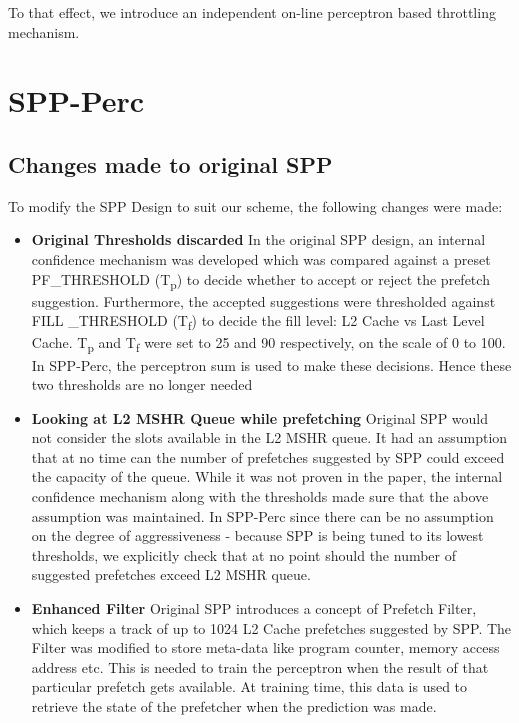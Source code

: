\documentclass{sig-alternate}
\begin{document}
To that effect, we introduce an independent on-line perceptron based throttling mechanism.

\section{SPP-Perc}

\subsection{Changes made to original SPP}
To modify the SPP Design to suit our scheme, the following changes were made:

\begin{itemize}
\item \textbf{Original Thresholds discarded}\newline
In the original SPP design, an internal confidence mechanism was developed which was compared against a preset PF\_THRESHOLD (T\textsubscript{p}) to decide whether to accept or reject the prefetch suggestion.
Furthermore, the accepted suggestions were thresholded against FILL \_THRESHOLD (T\textsubscript{f}) to decide the fill level: L2 Cache vs Last Level Cache.
T\textsubscript{p} and T\textsubscript{f} were set to 25 and 90 respectively, on the scale of 0 to 100.
In SPP-Perc, the perceptron sum is used to make these decisions. 
Hence these two thresholds are no longer needed

\item \textbf{Looking at L2 MSHR Queue while prefetching}\newline
Original SPP would not consider the slots available in the L2 MSHR queue. 
It had an assumption that at no time can the number of prefetches suggested by SPP could exceed the capacity of the queue. 
While it was not proven in the paper, the internal confidence mechanism along with the thresholds made sure that the above assumption was maintained. 
In SPP-Perc since there can be no assumption on the degree of aggressiveness - because SPP is being tuned to its lowest thresholds, we explicitly check that at no point should the number of suggested prefetches exceed L2 MSHR queue.

\item \textbf{Enhanced Filter}\newline
Original SPP introduces a concept of Prefetch Filter, which keeps a track of up to 1024 L2 Cache prefetches suggested by SPP. 
The Filter was modified to store meta-data like program counter, memory access address etc. 
This is needed to train the perceptron when the result of that particular prefetch gets available. 
At training time, this data is used to retrieve the state of the prefetcher when the prediction was made.


\end{itemize}
\end{document}
